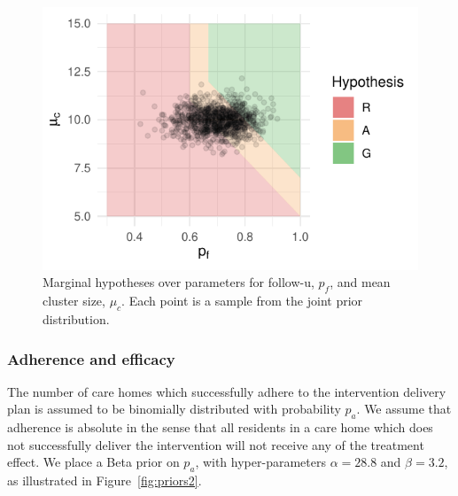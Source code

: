 \documentclass{article} %
\begin{document}
\begin{figure}
\centering
\includegraphics[scale=0.7]{./Figures/hyp_fu_cl} %
\caption{Marginal hypotheses over parameters for follow-u, $p_{f}$, and mean cluster size, $\mu_{c}$. Each point is a sample from the joint prior distribution.}
\label{fig:hyp_fu_cl}
\end{figure}

\subsubsection{Adherence and efficacy}

The number of  care homes which successfully adhere to the intervention delivery plan is assumed to be binomially distributed with probability $p_{a}$. We assume that adherence is absolute in the sense that all residents in a care home which does not successfully deliver the intervention will not receive any of the treatment effect. We place a Beta prior on $p_{a}$, with hyper-parameters $\alpha = 28.8$ and $\beta = 3.2$, as illustrated in Figure~\ref{fig:priors2}. 
\end{document}
